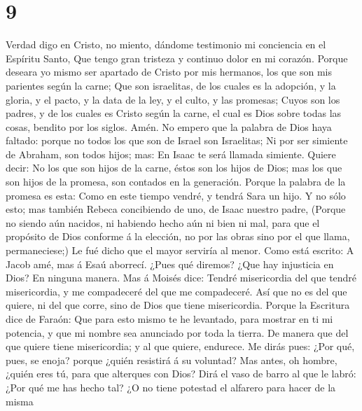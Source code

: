 \hypertarget{section-8}{%
\section{9}\label{section-8}}

 Verdad digo en Cristo, no miento, dándome testimonio mi
conciencia en el Espíritu Santo,  Que tengo gran tristeza
y continuo dolor en mi corazón.  Porque deseara yo mismo
ser apartado de Cristo por mis hermanos, los que son mis parientes según
la carne;  Que son israelitas, de los cuales es la
adopción, y la gloria, y el pacto, y la data de la ley, y el culto, y
las promesas;  Cuyos son los padres, y de los cuales es
Cristo según la carne, el cual es Dios sobre todas las cosas, bendito
por los siglos. Amén.  No empero que la palabra de Dios
haya faltado: porque no todos los que son de Israel son Israelitas;
 Ni por ser simiente de Abraham, son todos hijos; mas: En
Isaac te será llamada simiente.  Quiere decir: No los que
son hijos de la carne, éstos son los hijos de Dios; mas los que son
hijos de la promesa, son contados en la generación. 
Porque la palabra de la promesa es esta: Como en este tiempo vendré, y
tendrá Sara un hijo.  Y no sólo esto; mas también Rebeca
concibiendo de uno, de Isaac nuestro padre,  (Porque no
siendo aún nacidos, ni habiendo hecho aún ni bien ni mal, para que el
propósito de Dios conforme á la elección, no por las obras sino por el
que llama, permaneciese;)  Le fué dicho que el mayor
serviría al menor.  Como está escrito: A Jacob amé, mas á
Esaú aborrecí.  ¿Pues qué diremos? ¿Que hay injusticia en
Dios? En ninguna manera.  Mas á Moisés dice: Tendré
misericordia del que tendré misericordia, y me compadeceré del que me
compadeceré.  Así que no es del que quiere, ni del que
corre, sino de Dios que tiene misericordia.  Porque la
Escritura dice de Faraón: Que para esto mismo te he levantado, para
mostrar en ti mi potencia, y que mi nombre sea anunciado por toda la
tierra.  De manera que del que quiere tiene misericordia;
y al que quiere, endurece.  Me dirás pues: ¿Por qué,
pues, se enoja? porque ¿quién resistirá á su voluntad? 
Mas antes, oh hombre, ¿quién eres tú, para que alterques con Dios? Dirá
el vaso de barro al que le labró: ¿Por qué me has hecho tal?
 ¿O no tiene potestad el alfarero para hacer de la misma
